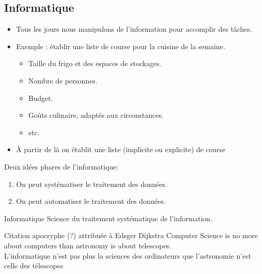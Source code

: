 \documentclass{beamer}
\begin{document}
\subsection{Informatique}

\begin{slide}
	\begin{itemize}
	\item Tous les jours nous manipulons de l'information pour accomplir des tâches.
	\item Exemple : établir une liste de course pour la cuisine de la semaine.
		
		\begin{itemize}
			\item Taille du frigo et des espaces de stockages.
			\item Nombre de personnes.
			\item Budget.
			\item Goûts culinaire, adaptés aux circonstances.
			\item etc.
		\end{itemize}
	\item À partir de là on établit une liste (implicite ou explicite) de course
	
	\end{itemize}
\end{slide}

\begin{slide}

Deux idées phares de l'informatique:
	\begin{enumerate}
		\item On peut systématiser le traitement des données.
		\item On peut automatiser le traitement des données.
	\end{enumerate}
\end{slide}

\begin{slide}

	
	
	\begin{block}{Informatique}
	Science du traitement systématique de l'information.
	\end{block}
	
	
	\begin{exampleblock}{Citation apocryphe (?) attribuée à Edsger Dijkstra}%
	Computer Science is no more about computers than astronomy is about telescopes.\\
	
	L'informatique n'est pas plus la sciences des ordinateurs que l'astronomie n'est celle des télescopes
	\end{exampleblock}
	
\end{slide}
\end{document}
